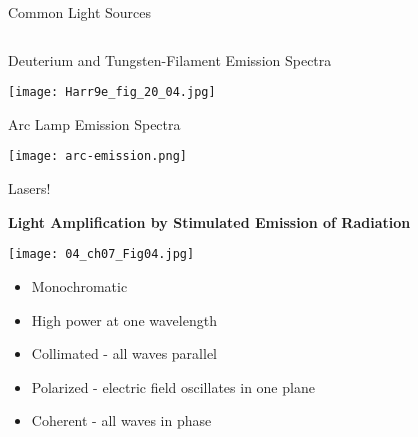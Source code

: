 \documentclass[handout]{beamer}
\begin{document}
\begin{frame}{Common Light Sources}
\begin{columns}



	\end{columns}
\end{frame}

\begin{frame}{Deuterium and Tungsten-Filament Emission Spectra}
	\begin{center}
		\texttt{[image: Harr9e\_fig\_20\_04.jpg]}
	\end{center}
\end{frame}

\begin{frame}{Arc Lamp Emission Spectra}
	\begin{center}
		\texttt{[image: arc-emission.png]}
	\end{center}
\end{frame}

\begin{frame}{Lasers!}
	\begin{center}
	\bfseries
	\alert{L}ight \alert{A}mplification by \alert{S}timulated
	\alert{E}mission of \alert{R}adiation

		\bigskip

		\texttt{[image: 04\_ch07\_Fig04.jpg]}
	\end{center}

	\begin{multicols}{2}
		\begin{itemize}
			\item Monochromatic
			\item High power at one wavelength
			\item Collimated - all waves parallel
			\item Polarized - electric field oscillates in one plane
			\item Coherent - all waves in phase
		\end{itemize}
	\end{multicols}
\end{frame}
\end{document}
